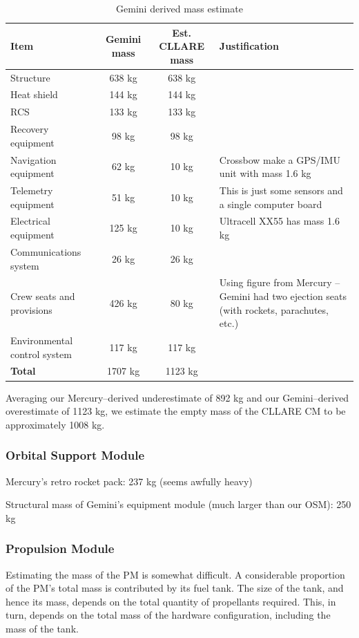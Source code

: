 \documentclass{report}
\begin{document}
\begin{table}
\centering
\begin{tabular}{|l|c|c|l|}
\hline
Item	& Gemini mass & Est. CLLARE mass & Justification \\
\hline \hline
Structure		& 638 kg	& 638 kg &  \\
Heat shield		& 144 kg	& 144 kg & \\
RCS			& 133 kg	& 133 kg & \\
Recovery equipment	& 98 kg		& 98 kg & \\
Navigation equipment	& 62 kg		& 10 kg & Crossbow make a GPS/IMU unit with mass 1.6 kg \\
Telemetry equipment	& 51 kg		& 10 kg & This is just some sensors and a single computer board \\
Electrical equipment	& 125 kg	& 10 kg & Ultracell XX55 has mass 1.6 kg \\
Communications system	& 26 kg		& 26 kg & \\
Crew seats and provisions & 426 kg	& 80 kg & Using figure from Mercury -- Gemini had two ejection seats (with rockets, parachutes, etc.) \\
Environmental control system	&  117 kg		& 117 kg & \\
\hline \hline
\textbf{Total}	& 1707 kg & 1123 kg	& \\
\hline
\end{tabular}
\caption{Gemini derived mass estimate}
\label{tab:geminimass}
\end{table} 

Averaging our Mercury--derived underestimate of 892 kg and our Gemini--derived overestimate of 1123 kg, we estimate the empty mass of the CLLARE CM to be approximately 1008 kg.

\subsubsection{Orbital Support Module}

Mercury's retro rocket pack: 237 kg (seems awfully heavy)

Structural mass of Gemini's equipment module (much larger than our OSM): 250 kg

\subsubsection{Propulsion Module}

Estimating the mass of the PM is somewhat difficult.  A considerable proportion of the PM's total mass is contributed by its fuel tank.  The size of the tank, and hence its mass, depends on the total quantity of propellants required.  This, in turn, depends on the total mass of the hardware configuration, including the mass of the tank.
\end{document}
